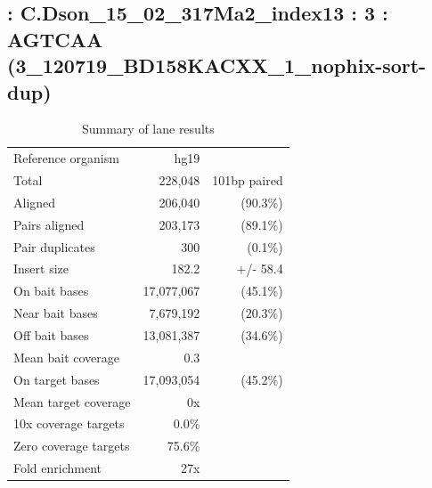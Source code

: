 \documentclass{article}
\begin{document}
    
\subsection*{ : C.Dson\_15\_02\_317Ma2\_index13 : 3 : AGTCAA (3\_120719\_BD158KACXX\_1\_nophix-sort-dup)}

    \begin{table}[h]
    \centering
    \begin{tabular}{|l|rr|}
    \hline
            Reference organism & hg19 &  \\ 
            Total & 228,048 & 101bp paired \\ 
            Aligned & 206,040 & (90.3\%) \\ 
            Pairs aligned & 203,173 & (89.1\%) \\ 
            Pair duplicates & 300 & (0.1\%) \\ 
            Insert size & 182.2 & +/- 58.4 \\ 
            \hline
            On bait bases & 17,077,067 & (45.1\%) \\ 
            Near bait bases & 7,679,192 & (20.3\%) \\ 
            Off bait bases & 13,081,387 & (34.6\%) \\ 
            Mean bait coverage & 0.3 &  \\ 
            On target bases & 17,093,054 & (45.2\%) \\ 
            Mean target coverage & 0x &  \\ 
            10x coverage targets & 0.0\% &  \\ 
            Zero coverage targets & 75.6\% &  \\ 
            Fold enrichment & 27x &  \\ 
    \hline
    \end{tabular}
    \caption{Summary of lane results}
    \end{table}
\end{document}
